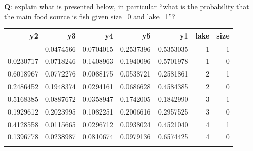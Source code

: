 \documentclass[
  ignorenonframetext,
]{beamer}
\newenvironment{Shaded}{\begin{snugshade}}{\end{snugshade}}
\newcommand{\AttributeTok}[1]{\textcolor[rgb]{0.13,0.29,0.53}{#1}}
\newcommand{\CommentTok}[1]{\textcolor[rgb]{0.56,0.35,0.01}{\textit{#1}}}
\newcommand{\FunctionTok}[1]{\textcolor[rgb]{0.13,0.29,0.53}{\textbf{#1}}}
\newcommand{\NormalTok}[1]{#1}
\newcommand{\OtherTok}[1]{\textcolor[rgb]{0.56,0.35,0.01}{#1}}
\newcommand{\SpecialCharTok}[1]{\textcolor[rgb]{0.81,0.36,0.00}{\textbf{#1}}}
\begin{document}
\begin{frame}[fragile]
\textbf{Q}: explain what is presented below, in particular ``what is the
probability that the main food source is fish given size=0 and lake=1''?

\small

\begin{Shaded}
\end{Shaded}

\begin{longtable}[]{@{}rrrrrrr@{}}
\toprule\noalign{}
y2 & y3 & y4 & y5 & y1 & lake & size \\
\midrule\noalign{}
\endhead
0.0930988 & 0.0474566 & 0.0704015 & 0.2537396 & 0.5353035 & 1 & 1 \\
0.0230717 & 0.0718246 & 0.1408963 & 0.1940096 & 0.5701978 & 1 & 0 \\
0.6018967 & 0.0772276 & 0.0088175 & 0.0538721 & 0.2581861 & 2 & 1 \\
0.2486452 & 0.1948374 & 0.0294161 & 0.0686628 & 0.4584385 & 2 & 0 \\
0.5168385 & 0.0887672 & 0.0358947 & 0.1742005 & 0.1842990 & 3 & 1 \\
0.1929612 & 0.2023995 & 0.1082251 & 0.2006616 & 0.2957525 & 3 & 0 \\
0.4128558 & 0.0115665 & 0.0296712 & 0.0938024 & 0.4521040 & 4 & 1 \\
0.1396778 & 0.0238987 & 0.0810674 & 0.0979136 & 0.6574425 & 4 & 0 \\
\bottomrule\noalign{}
\end{longtable}

\normalsize

\normalsize
\end{frame}
\end{document}
